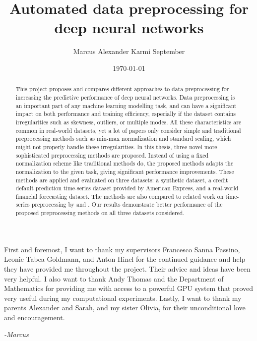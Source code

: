 \documentclass{statsmsc}
\title{Automated data preprocessing for deep neural networks}
\author{Marcus Alexander Karmi September}
\date{\today}
\begin{document}

\maketitle


\declarationdate{\today}
\declaration

\begin{abstract}
    This project proposes and compares different approaches to data preprocessing for
    increasing the predictive performance of deep neural networks.
    Data preprocessing is an important part of any machine learning modelling task, and
    can have a significant impact on both performance and training efficiency, especially
    if the dataset contains irregularities such as skewness, outliers, or multiple modes.
    All these characteristics are common in real-world datasets, yet a lot of papers only consider
    simple and traditional preprocessing methods such as min-max normalization and standard scaling, which might
    not properly handle these irregularities. 
    In this thesis, three novel more sophisticated preprocessing methods are proposed.
    Instead of using a fixed normalization scheme like traditional methods do, the
    proposed methods adapts the normalization to the given task, giving significant
    performance improvements. These methods are applied
    and evaluated on three datasets: a synthetic dataset, a credit default prediction
    time-series dataset provided by American Express, and a real-world financial forecasting dataset.
    The methods are also compared to related work on time-series preprocessing by \cite{dain} and \cite{bin}.
    Our results demonstrate better performance of the proposed preprocessing methods on all three
    datasets considered.



\end{abstract}

\begin{acknowledgements}
    First and foremost, I want to thank my supervisors Francesco Sanna Passino,
    Leonie Tabea Goldmann, and Anton Hinel for the continued guidance and help they
    have provided me throughout the project. Their advice and ideas have been very
    helpful.
    I also want to thank Andy Thomas and the Department of Mathematics for providing me with
    access to a powerful GPU system that proved very useful during my computational experiments.
    Lastly, I want to thank my parents Alexander and Sarah, and my sister Olivia,
    for their unconditional love and encouragement.

    \begin{flushright}
        \textit{-Marcus}
    \end{flushright}

\end{acknowledgements}
\end{document}
